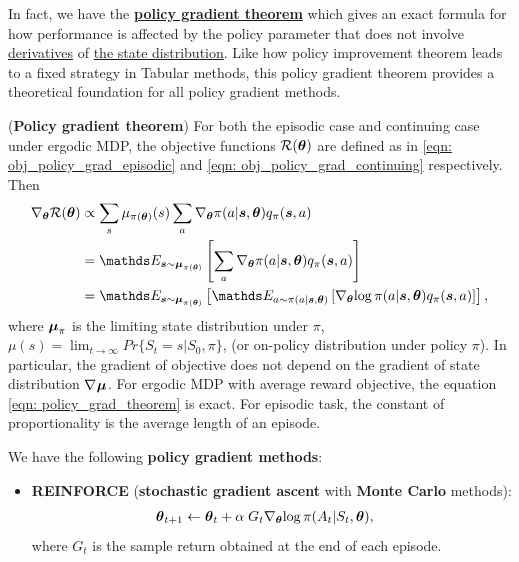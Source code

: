 \documentclass[11pt]{article}
\begin{document}
\begin{itemize}
In fact, we have the \underline{\textbf{policy gradient theorem}} which  gives an exact formula for how performance is affected by the policy parameter that does not involve \underline{derivatives} of \underline{the state distribution}. Like how policy improvement theorem leads to a fixed strategy in Tabular methods, this policy gradient theorem provides a theoretical foundation for all policy gradient methods.
\begin{theorem} (\textbf{Policy gradient theorem})
For both the episodic case and continuing case under ergodic MDP, the objective functions ${\mathcal R}(\boldsymbol{\theta})$ are defined as in \eqref{eqn: obj_policy_grad_episodic} and \eqref{eqn: obj_policy_grad_continuing} respectively. Then 
\begin{align}
\grad{\mb{\theta}}{\cR(\mb{\theta})} &\propto \sum_{s}\mu_{\pi(\mb{\theta})}(s)\sum_{a}\grad{\mb{\theta}}{\pi(a |\mb{s}, \mb{\theta})}q_{\pi}(\mb{s}, a) \label{eqn: policy_grad_theorem}\\
&= \E{\mb{s} \sim \mb{\mu}_{\pi(\mb{\theta})}}{\sum_{a}\grad{\mb{\theta}}{\pi(a |\mb{s}, \mb{\theta})}q_{\pi}(\mb{s}, a) } \label{eqn: policy_grad_theorem2} \\
&= \E{\mb{s} \sim \mb{\mu}_{\pi(\mb{\theta})}}{\E{a \sim \pi(a|\mb{s}, \mb{\theta})}{\grad{\mb{\theta}}{\log \pi(a |\mb{s}, \mb{\theta})}q_{\pi}(\mb{s}, a) }},\label{eqn: policy_grad_theorem3}
\end{align} where $\boldsymbol{\mu}_{\pi}$ is the limiting state distribution under $\pi$, $\mu(s) = \lim_{t\rightarrow \infty}Pr\{S_{t} = s| S_{0}, \pi\}$, (or on-policy distribution under policy $\pi$).  In particular, the gradient of objective does not depend on the gradient of state distribution $\nabla_{}{\boldsymbol{\mu}}$.  For ergodic MDP with average reward objective, the equation \eqref{eqn: policy_grad_theorem} is exact. For episodic task, the constant of proportionality is the average length of an episode.
\end{theorem}

We have the following \textbf{policy gradient methods}:
\begin{itemize}
\item \textbf{REINFORCE} (\textbf{stochastic gradient ascent} with \textbf{Monte Carlo} methods):
\begin{align}
\boldsymbol{\theta}_{t+1} &\leftarrow \boldsymbol{\theta}_{t} + \alpha \;G_{t}\nabla_{\boldsymbol{\theta}}{\log\pi(A_{t}|S_{t}, \boldsymbol{\theta})}, \label{eqn: reinforce_update}
\end{align} where $G_{t}$ is the sample return obtained at the end of each episode. 


\end{itemize}
\end{itemize}
\end{document}

